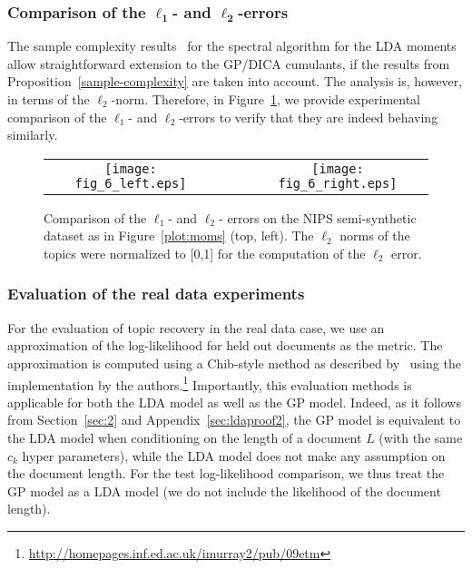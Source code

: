 \documentclass{article}
\begin{document}
\subsubsection{Comparison of the \texorpdfstring{$\mathbf{\ell_1}$}{L1}- and \texorpdfstring{$\mathbf{\ell_2}$}{L2}-errors}
The sample complexity results~\cite{AnaEtAl2012} for the spectral algorithm for the LDA moments allow straightforward extension to the GP/DICA cumulants, if the results from Proposition~\ref{sample-complexity} are taken into account. The analysis is, however, in terms of the $\ell_2$-norm. Therefore, in Figure~\ref{l1vsl2}, we provide experimental comparison of the $\ell_1$- and $\ell_2$-errors to verify that they are indeed behaving similarly.
\begin{figure}[t]
\centering
\begin{tabular}{cccc}
\texttt{[image: fig\_6\_left.eps]} 
 & 
 
 &
 
 &
\texttt{[image: fig\_6\_right.eps]} 
\end{tabular}
\caption{Comparison of the $\ell_1$- and $\ell_2$- errors on the NIPS semi-synthetic dataset as in Figure~\ref{plot:moms} (top, left). The $\ell_2$ norms of the topics were normalized to [0,1] for the computation of the $\ell_2$ error. }
\label{l1vsl2}
\end{figure}


\subsubsection{Evaluation of the real data experiments}\label{sec:evaluation-real}
For the evaluation of topic recovery in the real data case, we use an approximation of the log-likelihood for held out documents as the metric. The approximation is computed using a Chib-style method as described by~\cite{WalEtAl2009} using the implementation by the authors.\footnote{\url{http://homepages.inf.ed.ac.uk/imurray2/pub/09etm}}
Importantly, this evaluation methods is applicable for both the LDA model as well as the GP model. Indeed, as it follows from Section~\ref{sec:2} and Appendix~\ref{sec:ldaproof2}, the GP model is equivalent to the LDA model when conditioning on the length of a document $L$ (with the same $c_k$ hyper parameters), while the LDA model does not make any assumption on the document length. For the test log-likelihood comparison, we thus treat the GP model as a LDA model (we do not include the likelihood of the document length).
\end{document}
